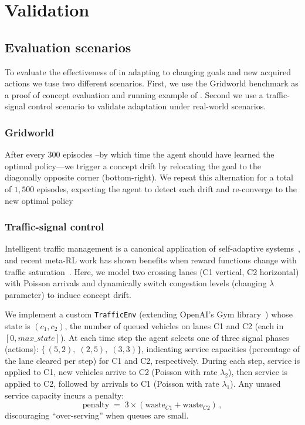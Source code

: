 
\section{Validation}
\label{sec:validation}

\subsection{Evaluation scenarios}
To evaluate the effectiveness of \adaptiverl in adapting to changing goals and new acquired actions we tuse two different scenarios. First, we use the Gridworld benchmark as a proof of concept evaluation and running example of \adaptiverl. Second we use a traffic-signal control scenario to validate adaptation under real-world scenarios.

\subsubsection{Gridworld}
After every 300 episodes --by 
which time the agent should have learned the optimal policy---we trigger a concept drift by relocating 
the goal to the diagonally opposite corner (bottom-right). We repeat this alternation for a total of $1,500$ 
episodes, expecting the agent to detect each drift and re-converge to the new optimal policy

\subsubsection{Traffic-signal control}
Intelligent traffic management is a canonical application of self-adaptive systems~\cite{HENRICHS2022106940}, and recent meta-\ac{RL} work has shown benefits when reward functions change with traffic saturation~\cite{meta-rl-traffic}. Here, we model two crossing lanes (C1 vertical, C2 horizontal) with Poisson arrivals and dynamically switch congestion levels (changing $\lambda$ parameter) to induce concept drift. 

We implement a custom \texttt{TrafficEnv} (extending OpenAI's Gym library~\cite{towers2024gymnasiumstandardinterfacereinforcement}) whose state is $(c_1,c_2)$, the number of queued vehicles on lanes C1 and C2 (each in $[0,\mathit{max\_state}]$). At each time step the agent selects one of three signal phases (actions): $\{\,(5,2),\;(2,5),\;(3,3)\}$, indicating service capacities (percentage of the lane cleared per step) for C1 and C2, respectively. During each step, service is applied to C1, new vehicles arrive to C2 (Poisson with rate $\lambda_{2}$), then service is applied to C2, followed by arrivals to C1 (Poisson with rate $\lambda_{1}$). Any unused service capacity incurs a penalty:
\[
\mathrm{penalty} \;=\; 3\times(\text{waste}_{C1} + \text{waste}_{C2})\,,
\]
discouraging “over-serving” when queues are small.

